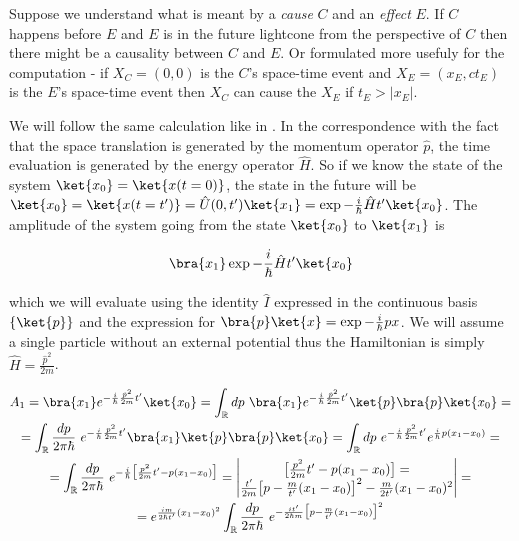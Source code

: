 \begin{definition}
    \label{df:causality}
    Suppose we understand what is meant by a \textit{cause} $C$ and an \textit{effect} $E$. If $C$ happens before $E$ and 
    $E$ is in the future lightcone from the perspective of $C$ then there might be a causality between $C$ and $E$.  Or
    formulated more usefuly for the computation - if $X_{C} = (0, 0)$ is the $C$'s space-time event and 
    $X_{E} = (x_{E}, ct_{E})$ is the $E$'s space-time event then $X_{C}$ can cause the $X_{E}$ if $t_{E} > |x_{E}|$.
\end{definition}

We will follow the same calculation like in \cite{peskin_schroeder}. In the correspondence with the fact that the space translation
is generated by the momentum operator $\hat{p}$, the time evaluation is generated by the energy operator $\hat{H}$. So
if we know the state of the system $\ket{x_{0}} = \ket{x(t=0)}$, the state in the future will be 
$\ket{x_{0}} = \ket{x(t=t')} = \hat{U}(0, t') \ket{x_{1}} = \exp{- \frac{i}{\hbar} \hat{H} t'} \ket{x_{0}}$. The amplitude of the
system going from the state $\ket{x_{0}}$ to $\ket{x_{1}}$ is 

\begin{equation}
    \bra{x_{1}} \exp{- \frac{i}{\hbar} \hat{H} t'}\ket{x_{0}}
\end{equation}

which we will evaluate using the identity $\hat{I}$ expressed in the continuous basis $\{\ket{p}\}$ and the expression for
$\bra{p}\ket{x} = \exp{- \frac{i}{\hbar} p x}$. We will assume a single particle without an external potential thus the
Hamiltonian is simply $\hat{H} = \frac{\hat{p}^{2}}{2m}$.

\begin{equation*}
    \begin{gathered}
        A_{1} = \bra{x_{1}} e^{- \frac{i}{\hbar} \frac{\hat{p}^{2}}{2m} t'}\ket{x_{0}} = \int_{\mathbb{R}} dp \ \bra{x_{1}} e^{- \frac{i}{\hbar} \frac{\hat{p}^{2}}{2m} t'}\ket{p} \bra{p} \ket{x_{0}} = \\
        = \int_{\mathbb{R}} \frac{dp}{2 \pi \hbar} \ e^{- \frac{i}{\hbar} \frac{p^{2}}{2m} t'} \bra{x_{1}}\ket{p} \bra{p} \ket{x_{0}} = \int_{\mathbb{R}} dp \ e^{- \frac{i}{\hbar} \frac{p^{2}}{2m} t'} e^{\frac{i}{\hbar}p (x_{1} - x_{0})} = \\
        = \int_{\mathbb{R}} \frac{dp}{2 \pi \hbar} \ e^{- \frac{i}{\hbar} \big[\frac{p^{2}}{2m} t' - p (x_{1} - x_{0})\big]} = 
        \begin{vmatrix}
            \big[\frac{p^{2}}{2m} t' - p (x_{1} - x_{0})\big] =  \\
            \frac{t'}{2m} \big[p - \frac{m}{t'}(x_{1} - x_{0})\big]^{2} - \frac{m}{2t'}(x_{1} - x_{0})^{2} \\
        \end{vmatrix} = \\
        = e^{\frac{im}{2\hbar t'} (x_{1} - x_{0})^{2}} \int_{\mathbb{R}} \frac{dp}{2 \pi \hbar} \ e^{- \frac{i t'}{2 \hbar m} \big[p - \frac{m}{t'}(x_{1} - x_{0})\big]^{2}} \\
    \end{gathered}
\end{equation*}

